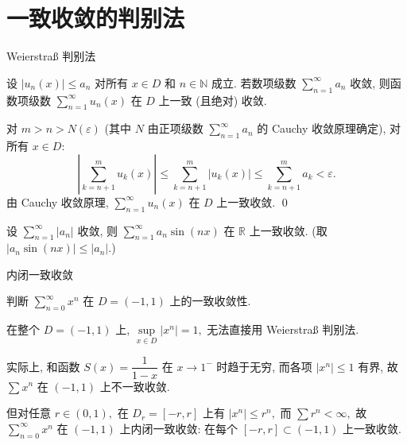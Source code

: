 
\section[判别法]{一致收敛的判别法}


\begin{frame}{Weierstra\ss{} 判别法}

\begin{thm}
设 $|u_n(x)| \leqslant a_n$ 对所有 $x \in D$ 和 $n \in \mathbb{N}$ 成立. 若数项级数 $\sum\limits_{n=1}^\infty a_n$ 收敛, 则函数项级数 $\sum\limits_{n=1}^\infty u_n(x)$ 在 $D$ 上一致 (且绝对) 收敛.
\end{thm}

\pause

\startproof[bg=yellow, fg=red]
对 $m > n > N(\varepsilon)$ (其中 $N$ 由正项级数 $\sum\limits_{n=1}^\infty a_n$ 的 Cauchy 收敛原理确定), 对所有 $x \in D:$
\[
\left| \sum_{k=n+1}^m u_k(x) \right| \leqslant \sum_{k=n+1}^m |u_k(x)| \leqslant \sum_{k=n+1}^m a_k < \varepsilon.
\]
由 Cauchy 收敛原理, $\sum\limits_{n=1}^\infty u_n(x)$ 在 $D$ 上一致收敛.
\qed

\pause
\vspace{0.5em}

\begin{eg}
设 $\sum\limits_{n=1}^\infty |a_n|$ 收敛, 则 $\sum\limits_{n=1}^\infty a_n \sin(nx)$ 在 $\mathbb{R}$ 上一致收敛. (取 $|a_n \sin(nx)| \leqslant |a_n|.$)
\end{eg}

\end{frame}


\begin{frame}{内闭一致收敛}

\begin{eg}
判断 $\sum_{n=0}^\infty x^n$ 在 $D = (-1, 1)$ 上的一致收敛性.
\end{eg}

\pause

在整个 $D = (-1, 1)$ 上, $\sup\limits_{x \in D} |x^n| = 1,$ 无法直接用 Weierstra\ss{} 判别法.

\pause
\vspace{0.5em}

实际上, 和函数 $S(x) = \dfrac{1}{1-x}$ 在 $x \to 1^-$ 时趋于无穷, 而各项 $|x^n| \leqslant 1$ 有界, 故 $\sum x^n$ 在 $(-1, 1)$ 上\alert{不一致收敛.}

\pause
\vspace{0.5em}

但对任意 $r \in (0, 1),$ 在 $D_r = [-r, r]$ 上有 $|x^n| \leqslant r^n,$ 而 $\sum r^n < \infty,$ 故 $\sum_{n=0}^\infty x^n$ 在 $(-1, 1)$ 上\alert{内闭一致收敛}: 在每个 $[-r, r] \subset (-1, 1)$ 上一致收敛.

\end{frame}

